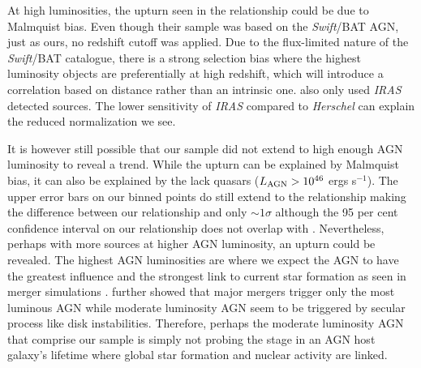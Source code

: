 \documentclass[fleqn, usenatbib]{mnras}
\newcommand{\herschel}{\emph{Herschel}}
\newcommand{\swift}{\textit{Swift}}
\begin{document}
At high luminosities, the upturn seen in the \citet{Rosario:2012fr} relationship could be due to Malmquist bias. Even though their sample was based on the \swift/BAT AGN, just as ours, no redshift cutoff was applied. Due to the flux-limited nature of the \swift/BAT catalogue, there is a strong selection bias where the highest luminosity objects are preferentially at high redshift, which will introduce a correlation based on distance rather than an intrinsic one. \citet{Rosario:2012fr} also only used \textit{IRAS} detected sources. The lower sensitivity of \textit{IRAS} compared to \herschel{} can explain the reduced normalization we see. %

It is however still possible that our sample did not extend to high enough AGN luminosity to reveal a trend. While the upturn can be explained by Malmquist bias, it can also be explained by the lack quasars ($L_{\rm AGN} > 10^{46}$ ergs s$^{-1}$). The upper error bars on our binned points do still extend to the \citet{Rosario:2012fr} relationship making the difference between our relationship and \citet{Rosario:2012fr} only $\sim1\sigma$ although the 95 per cent confidence interval on our relationship does not overlap with \citet{Rosario:2012fr}. Nevertheless, perhaps with more sources at higher AGN luminosity, an upturn could be revealed. The highest AGN luminosities are where we expect the AGN to have the greatest influence and the strongest link to current star formation as seen in merger simulations \citep[e.g.][]{Di-Matteo:2005lr}. \citet{Treister:2012rt} further showed that major mergers trigger only the most luminous AGN while moderate luminosity AGN seem to be triggered by secular process like disk instabilities. Therefore, perhaps the moderate luminosity AGN that comprise our sample is simply not probing the stage in an AGN host galaxy's lifetime where global star formation and nuclear activity are linked. 
\end{document}
